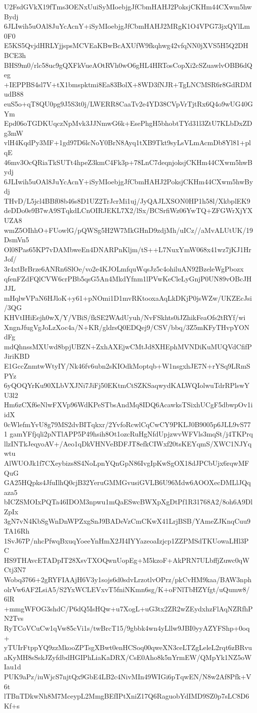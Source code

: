 U2FsdGVkX19fTms3OENxUuiSyMIoebjgJfCbmHAHJ2PoksjCKHm44CXwm5hwBydj
6JLIwih5uOAl8JuYcAcnY+iSyMIoebjgJfCbmHAHJ2MRgK1O4VPG73jxQYlLm0F0
E5KS5QvjdHRLYjjspsMCVEaKBwBcAXUfW9fkqhwg42vfqNN0jXVS5H5Q2DHBCE3h
BHS9m0/rlc58uc9gQXFkVueAOtRVh0wO6gHL4HRTosCopXi2cSZuawlvOBB6dQeg
+IEPPBS4sl7V+tX1bmspktmi8Ea83BolX+8WD3fNJR+TgLNCMSR6r8GdRDMudB88
euS5o+qT8QU0pg9J5S3t0j/LWERR8CaaTv2e4YD38CVpVrTjtRx6Q4o9wUG40GYm
Epd06oTGDKUqczNpMvk3JJNmwG6k+EsePhgH5bhobtTYd31l3ZtU7KLbDxZDg3mW
vlH4KqdPy3MF+1gd97D6lcNoY0BrN8Ayq1tXB9Tkt9syLsVLmAcmDb8Yl81+plqE
46mv3OcQRiaTkSUTt4hpeZ3kmC4Fk3p+78LnC7deqnjoksjCKHm44CXwm5hwBydj
6JLIwih5uOAl8JuYcAcnY+iSyMIoebjgJfCbmHAHJ2PoksjCKHm44CXwm5hwBydj
THvD/L5jcl4BBf08b46s8D1UZ2TrJcrMi1uj/JyQAJLXSON0HP1h58l/XkbplEK9
deDDo0e9B7wA9STqkdLCnOIRJEKL7X2/lSx/BCSrfiWz06YwTQ+ZFGWrXjYXUZA8
wmZ5OIhhO+FUowlG/pQWSg5H2W7MkGHnD9zdjMh/uICz//aMvALUtUK/19DsmVn5
Ol08Pas65KP7vDAMbweEn4DNARPnKljm/tS++L7NuxYmW068x41wz7jKJ1HrJof/
3r4xtBrBrze6ANRn6SlOe/vo2e4KJOLmfquWqsJz5c4ohiluAN92BzeleWgPbozx
qfenFZdFQlCVW6crPBb5qsG5An4MkdYfnm1lPVwKeCleLyGnjP0UN89vOBcJHJJL
mHqlwVPaN6HJloK+y61+pNOmi1D1mvRKtooxaAqLkDKjP0jsWZw/UKZEcJsi/3QG
KHVtIHiEejh0wX/Y/VBiS/fkSE2WAdUyuh/NvFSkhts0iJZhikFeaOfs2tRYf/wi
XngnJfugVgJoLzXoc4a/N+KR/gldrsQ0EDQej9/CSV/bbq/3Z5mKFyTHvpYONdFg
mdQhnssMXUwd8bpjUBZN+ZxhAXEjwCMtJd8XHEphMVNDiKuMUQVdCfifPJiriKBD
E1GccZnmtwWtyIY/Nk46fv6ubn2sKIOdkMoptqb+W1nsgxhJE7N+rYSq9LRmSPYz
6yQOQYrKu90XLbVXJNi7JiFj50EKtmCtSZKSaqwydKALWQIolwuTdrRPlswYU3l2
Hm6zCXf6eNlwFXVp96WdKPeSTbsAndMq8IDQ6AcawksTSixhUCgF5dbwpOv1iidX
0cWlefmYvU8g79MS2dvBITqkxr/2YvfoRcwlCqCwCY9PKLJ0B9005p6JLL9vS771
gamYFfjqli2pNTlAPP5P49hsih8Ot1ozcRuHgNfdUpjzwvWFVls3mqSt/j4TKPrq
llzINTkJeqyoAV+/Aeo1qDkVHNVeBDFJT8efkCIWxf20tsKEYqmS/XWC1NJYqwtu
AlWUOJk1f7CXeybizs8S4NoLpnYQnGpN86IvgIpKwSgOX18dJPCbUjx6rqwMFQuG
GA25HQpks4JfuIlhQ0cjB32YeruGMMGvusiGVLB6U96Mdw6AOOXecDMLlJQqaza5
bICZSMOIxPQTa46IDOM3npwu1mQaESwcBWXpXgDtPf1R31768A2/8oh6A9DlZpIx
3gN7vN4KbSgWnDnWPZxgSnJ9BADeVzCmCKwX41LrjBSB/YAmeZJKnqCuu9TA16Rh
1SvJ67P/nhcPfwqBxuqYoeeYnHmX2JI4IYYazeoaIzjcp1ZZPMSdTKUowaLHl3PC
HS9THAvcETADpIT28XsvTXOQwnUopEg+M5kzoF+AkPRN7ULbffjZuwc0qWCtj3N7
Wobq3766+2gRYFIAAjH6V3y1sojs6d0sdvLrzotlvOPrz/pkCvHM9kaa/BAW3nph
olrVw6AF2LsiA5/S2YxWCLEVxvT5fniNKmn6sg/K+oFNlTbHZYfgt/uQumw8/6lR
+mmgWFOG3shdC/P6dQ5IsHQw+u7XogL+uG3tx2ZR2wZEydxhzFlAqNZRfhPN2Tvs
RyTCoVCuCw1qVw85cVi1s/twBrcT15/9gbbk4wn4yLllw9JBI0yyAZYFShp+0oq+
yTUIrFtppYQ9zzMkooZPTsgXBwt0enHCSoq00qweXN3ceLTZgLeleL2rqt6zBRvu
aKyMH8sSskJZyfdbdHGIPhLiaKaDRX/CsE0Aho8k5nYrmEW/QMpYk1NZ5oWIau1d
PUK9aPz/iuWjcS7njtQx9GbE4LB2c4NivMIn49WIGi6pTqwEN/N8w2Af8Pfk+V6t
lTBnTDkwNh8M7MceypL2MmgBEfIPtXniZ17Q6RaguobYdIMD9SZ0p7sLC8D6Kf+s
